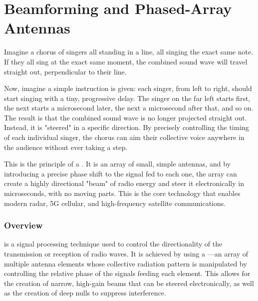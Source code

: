 
\chapter{Beamforming and Phased-Array Antennas}
\label{ch:beamforming}

\begin{nontechnical}
    Imagine a chorus of singers all standing in a line, all singing the exact same note. If they all sing at the exact same moment, the combined sound wave will travel straight out, perpendicular to their line.

    Now, imagine a simple instruction is given: each singer, from left to right, should start singing with a tiny, progressive delay. The singer on the far left starts first, the next starts a microsecond later, the next a microsecond after that, and so on. The result is that the combined sound wave is no longer projected straight out. Instead, it is "steered" in a specific direction. By precisely controlling the timing of each individual singer, the chorus can aim their collective voice anywhere in the audience without ever taking a step.

    This is the principle of a . It is an array of small, simple antennas, and by introducing a precise phase shift to the signal fed to each one, the array can create a highly directional "beam" of radio energy and steer it electronically in microseconds, with no moving parts. This is the core technology that enables modern radar, 5G cellular, and high-frequency satellite communications.
\end{nontechnical}

\subsection{Overview}

 is a signal processing technique used to control the directionality of the transmission or reception of radio waves. It is achieved by using a —an array of multiple antenna elements whose collective radiation pattern is manipulated by controlling the relative phase of the signals feeding each element. This allows for the creation of narrow, high-gain beams that can be steered electronically, as well as the creation of deep nulls to suppress interference.

